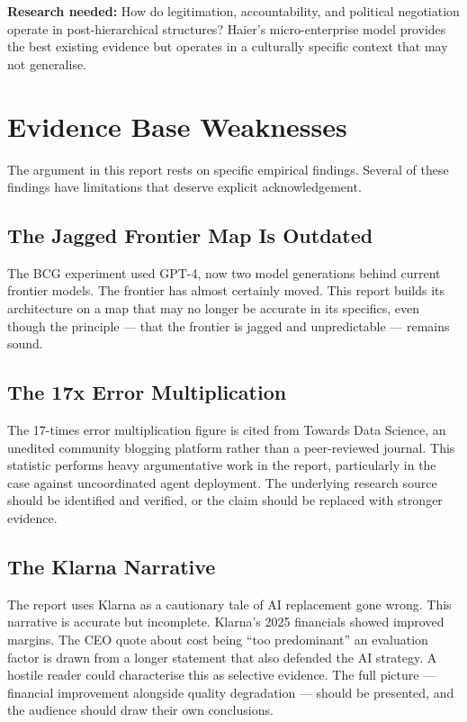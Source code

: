 \textbf{Research needed:} How do legitimation, accountability, and political negotiation operate in post-hierarchical structures? Haier's micro-enterprise model provides the best existing evidence but operates in a culturally specific context that may not generalise.

\section{Evidence Base Weaknesses}

The argument in this report rests on specific empirical findings. Several of these findings have limitations that deserve explicit acknowledgement.

\subsection{The Jagged Frontier Map Is Outdated}

The BCG experiment \parencite{DellAcqua2026} used GPT-4, now two model generations behind current frontier models. The frontier has almost certainly moved. This report builds its architecture on a map that may no longer be accurate in its specifics, even though the principle --- that the frontier is jagged and unpredictable --- remains sound.

\subsection{The 17x Error Multiplication}

The 17-times error multiplication figure \parencite{TDS2026} is cited from Towards Data Science, an unedited community blogging platform rather than a peer-reviewed journal. This statistic performs heavy argumentative work in the report, particularly in the case against uncoordinated agent deployment. The underlying research source should be identified and verified, or the claim should be replaced with stronger evidence.

\subsection{The Klarna Narrative}

The report uses Klarna as a cautionary tale of AI replacement gone wrong. This narrative is accurate but incomplete. Klarna's 2025 financials showed improved margins. The CEO quote about cost being ``too predominant'' an evaluation factor is drawn from a longer statement that also defended the AI strategy. A hostile reader could characterise this as selective evidence. The full picture --- financial improvement alongside quality degradation --- should be presented, and the audience should draw their own conclusions.

